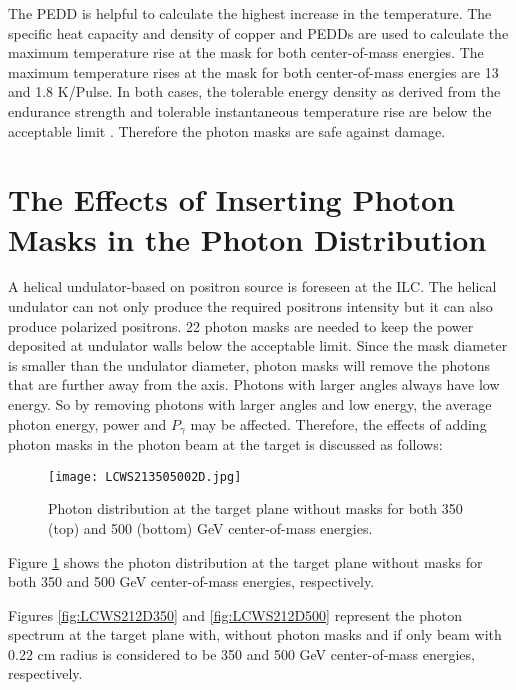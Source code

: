 \documentclass[a4paper]{article}
\begin{document}
The PEDD is helpful to calculate the highest increase in the temperature. The specific heat capacity and density of copper and  PEDDs are used to calculate the maximum temperature rise at the mask for both center-of-mass energies. The maximum temperature rises at the mask for both center-of-mass energies are 13 and 1.8  K/Pulse. In both cases, the tolerable energy density as derived from the endurance strength and tolerable instantaneous temperature rise are below the acceptable limit \cite{maslov2006layout}. Therefore the photon masks are safe against damage.



\section{The Effects of Inserting Photon Masks in the Photon Distribution} 
A helical undulator-based on positron source is foreseen at the ILC. The helical undulator can not only produce the required positrons intensity but it can also produce polarized positrons.
22 photon masks are needed to keep the power deposited at undulator walls below the acceptable limit. Since the mask diameter is smaller than the undulator diameter, photon masks will remove the photons that are further away from the axis. Photons with larger angles always have low energy. So by removing photons with larger angles and low energy, the average photon energy, power and $P_\gamma$ may be affected. Therefore, the effects of adding photon masks in the photon beam at the target is discussed as follows: 





\begin{figure}[h]
\centering
\texttt{[image: LCWS213505002D.jpg]}
\caption{Photon distribution at the target plane without masks for both 350 (top) and 500 (bottom) GeV center-of-mass energies.}
\label{fig:LCWS212D175250}
\end{figure}

Figure \ref{fig:LCWS212D175250} shows the photon distribution at the target plane without masks for both 350 and 500 GeV center-of-mass energies, respectively.



 Figures \ref{fig:LCWS212D350}  and \ref{fig:LCWS212D500} represent the photon spectrum at the target plane with, without photon masks and if only beam with 0.22 cm radius is considered to be 350 and 500 GeV center-of-mass energies, respectively.
\end{document}
